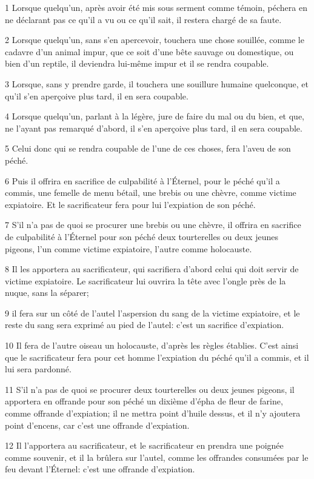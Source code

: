 \par 1 Lorsque quelqu'un, après avoir été mis sous serment comme témoin, péchera en ne déclarant pas ce qu'il a vu ou ce qu'il sait, il restera chargé de sa faute.
\par 2 Lorsque quelqu'un, sans s'en apercevoir, touchera une chose souillée, comme le cadavre d'un animal impur, que ce soit d'une bête sauvage ou domestique, ou bien d'un reptile, il deviendra lui-même impur et il se rendra coupable.
\par 3 Lorsque, sans y prendre garde, il touchera une souillure humaine quelconque, et qu'il s'en aperçoive plus tard, il en sera coupable.
\par 4 Lorsque quelqu'un, parlant à la légère, jure de faire du mal ou du bien, et que, ne l'ayant pas remarqué d'abord, il s'en aperçoive plus tard, il en sera coupable.
\par 5 Celui donc qui se rendra coupable de l'une de ces choses, fera l'aveu de son péché.
\par 6 Puis il offrira en sacrifice de culpabilité à l'Éternel, pour le péché qu'il a commis, une femelle de menu bétail, une brebis ou une chèvre, comme victime expiatoire. Et le sacrificateur fera pour lui l'expiation de son péché.
\par 7 S'il n'a pas de quoi se procurer une brebis ou une chèvre, il offrira en sacrifice de culpabilité à l'Éternel pour son péché deux tourterelles ou deux jeunes pigeons, l'un comme victime expiatoire, l'autre comme holocauste.
\par 8 Il les apportera au sacrificateur, qui sacrifiera d'abord celui qui doit servir de victime expiatoire. Le sacrificateur lui ouvrira la tête avec l'ongle près de la nuque, sans la séparer;
\par 9 il fera sur un côté de l'autel l'aspersion du sang de la victime expiatoire, et le reste du sang sera exprimé au pied de l'autel: c'est un sacrifice d'expiation.
\par 10 Il fera de l'autre oiseau un holocauste, d'après les règles établies. C'est ainsi que le sacrificateur fera pour cet homme l'expiation du péché qu'il a commis, et il lui sera pardonné.
\par 11 S'il n'a pas de quoi se procurer deux tourterelles ou deux jeunes pigeons, il apportera en offrande pour son péché un dixième d'épha de fleur de farine, comme offrande d'expiation; il ne mettra point d'huile dessus, et il n'y ajoutera point d'encens, car c'est une offrande d'expiation.
\par 12 Il l'apportera au sacrificateur, et le sacrificateur en prendra une poignée comme souvenir, et il la brûlera sur l'autel, comme les offrandes consumées par le feu devant l'Éternel: c'est une offrande d'expiation.
